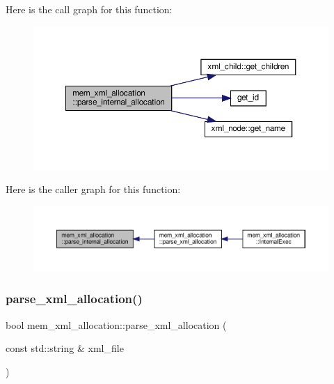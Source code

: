 Here is the call graph for this function\+:
\nopagebreak
\begin{figure}[H]
\begin{center}
\leavevmode
\includegraphics[width=350pt]{d2/d51/classmem__xml__allocation_ac852d2afeb6ecf0daf13d20befcb9071_cgraph}
\end{center}
\end{figure}
Here is the caller graph for this function\+:
\nopagebreak
\begin{figure}[H]
\begin{center}
\leavevmode
\includegraphics[width=350pt]{d2/d51/classmem__xml__allocation_ac852d2afeb6ecf0daf13d20befcb9071_icgraph}
\end{center}
\end{figure}
\mbox{\label{classmem__xml__allocation_a693defa1d1e5801b490788f19f4aeddc}} 
\subsubsection{\texorpdfstring{parse\+\_\+xml\+\_\+allocation()}{parse\_xml\_allocation()}}
{\footnotesize\ttfamily bool mem\+\_\+xml\+\_\+allocation\+::parse\+\_\+xml\+\_\+allocation (\begin{DoxyParamCaption}\item[{const std\+::string \&}]{xml\+\_\+file }\end{DoxyParamCaption})\hspace{0.3cm}{\ttfamily [private]}}



